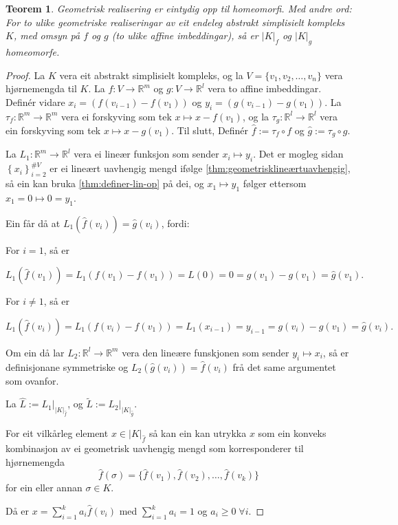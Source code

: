 \documentclass[a4paper, 12pt, norsk]{article}
\theoremstyle{plain}
\newtheorem{theorem}{Teorem}[section]
\theoremstyle{definition}
\newcommand{\Rb}{\mathbb{R}}
\newcommand{\gr}[1]{ \lvert #1 \rvert } %
\newcommand{\set}[1]{ \left\{ #1 \right\} } %
\begin{document}
\begin{theorem} \label{thm:gr-eintydig}
	Geometrisk realisering er eintydig opp til homeomorfi. Med andre ord: For to ulike geometriske realiseringar av eit endeleg abstrakt simplisielt kompleks $K$, med omsyn på $f$ og $g$ (to ulike affine imbeddingar), så er $\gr{K}_f$ og $\gr{K}_g$ homeomorfe.
\end{theorem}

\begin{proof}
	La $K$ vera eit abstrakt simplisielt kompleks, og la $V=\{ v_1, v_2, \dots, v_n \}$ vera hjørnemengda til $K$. La $f:V\to\Rb^m$ og $g:V\to\Rb^l$ vera to affine imbeddingar. Definér vidare $x_i=(f(v_{i-1})-f(v_1))$ og $y_i=(g(v_{i-1})-g(v_1))$. La $\tau_f:\Rb^m\to\Rb^m$ vera ei forskyving som tek $x\mapsto x-f(v_1)$, og la $\tau_g:\Rb^l\to\Rb^l$ vera ein forskyving som tek $x\mapsto x-g(v_1)$. Til slutt, Definér $\hat{f}:=\tau_f\circ f$ og $\hat{g}:=\tau_g \circ g$.
	
	La $L_1:\Rb^m\to\Rb^l$ vera ei lineær funksjon som sender $x_i\mapsto y_i$. Det er mogleg sidan \( \set{x_i}_{i=2}^{\#V} \) er ei lineært uavhengig mengd ifølge \autoref{thm:geometrisklineærtuavhengig}, så ein kan bruka \autoref{thm:definer-lin-op} på dei, og \( x_1 \mapsto y_1 \) følger ettersom \( x_1 = 0 \mapsto 0 = y_1 \).

	Ein får då at $L_1(\hat{f}(v_i))=\hat{g}(v_i)$, fordi:
	
	For $i=1$, så er

	\[
		L_1(\hat{f}(v_1))=L_1(f(v_1)-f(v_1))=L(0)=0=g(v_1)-g(v_1)=\hat{g}(v_1).
	\]

	For $i\neq 1$, så er

	\[
		L_1(\hat{f}(v_i))=L_1(f(v_i)-f(v_1))=L_1(x_{i-1})=y_{i-1}=g(v_i)-g(v_1)=\hat{g}(v_i).
	\]

	Om ein då lar $L_2:\Rb^l\to\Rb^m$ vera den lineære funskjonen som sender $y_i\mapsto x_i$, så er definisjonane symmetriske og \( L_2(\hat{g}(v_i))=\hat{f}(v_i) \) frå det same argumentet som ovanfor.

	La $\hat{L} := L_1|_{\gr{K}_{\hat{f}}}$, og $\tilde{L} := L_2|_{\gr{K}_{\hat{g}}}$.

	For eit vilkårleg element $x\in\gr{K}_{\hat{f}}$ så kan ein kan utrykka $x$ som ein konveks kombinasjon av ei geometrisk uavhengig mengd som korresponderer til hjørnemengda 
	\[ 
		\hat{f}(\sigma) = \{\hat{f}(v_1), \hat{f}(v_2), \dots, \hat{f}(v_k)\}
	\] 
	for ein eller annan \( \sigma \in K \).
	
	Då er $x=\sum_{i=1}^ka_i\hat{f}(v_i)$ med $\sum_{i=1}^ka_i=1$ og $a_i\geq0\; \forall i$. 
	

\end{proof}
\end{document}
